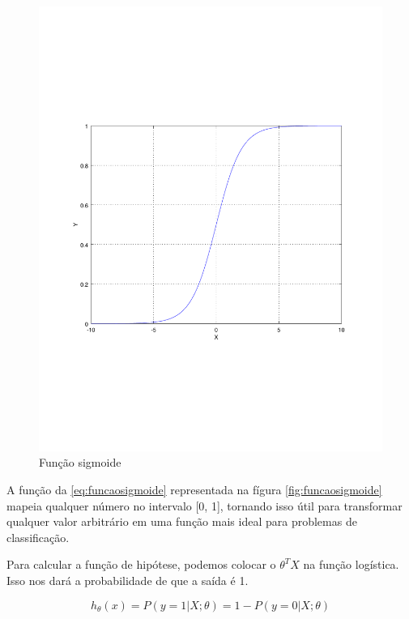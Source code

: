 \begin{figure}[htb]
  \caption{Função sigmoide}\label{fig:funcaosigmoide}
  \begin{center}
      \includegraphics[scale=0.75]{img/funcaosigmoide}
  \end{center}
\end{figure}

A função da \autoref{eq:funcaosigmoide} representada na fígura \autoref{fig:funcaosigmoide} mapeia qualquer número no intervalo [0, 1], tornando isso útil para transformar qualquer valor arbitrário em uma função mais ideal para problemas de classificação.

Para calcular a função de hipótese, podemos colocar o $\theta^TX$ na função logística. Isso nos dará a probabilidade de que a saída é 1.

\begin{equation}
h_{\theta}(x) = P(y=1 | X ; \theta) = 1 - P(y=0 | X ; \theta) \nonumber
\end{equation}

